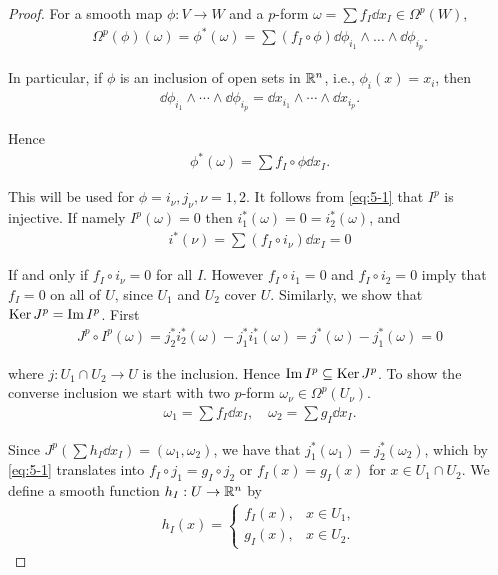 \begin{proof}
  For a smooth map $\phi:V\to W$ and a $p$-form $\omega = \sum f_I\dd x_I\in \Omega^p(W)$,
  \begin{align*}
    \Omega^p(\phi)(\omega)=\phi^*(\omega)=\sum (f_I\circ\phi)\dd\phi_{i_1}\wedge\ldots\wedge\dd\phi_{i_p}.    
  \end{align*}

  In particular, if $\phi$ is an inclusion of open sets in $\mathbb{R}^n$, i.e., $\phi_i(x) = x_i$, then 
  \begin{align*}
    \dd \phi_{i_1}\wedge\cdots\wedge\dd\phi_{i_p} = \dd x_{i_1}\wedge\cdots\wedge\dd x_{i_p}.  
  \end{align*}

  Hence 
  \begin{align}\label{eq:5-1}
    \phi^*(\omega) = \sum f_I\circ\phi\dd x_I.
  \end{align}

  This will be used for $\phi = i_\nu, j_\nu, \nu=1, 2$. It follows from \eqref{eq:5-1} that $I^p$ is injective.
  If namely $I^p(\omega) = 0$ then $i^*_1(\omega) = 0 = i^*_2(\omega)$, and 
  \begin{align*}
    i^*(\nu) = \sum (f_I\circ i_\nu)\dd x_I = 0
  \end{align*}

  If and only if $f_I\circ i_\nu = 0$ for all $I$. However $f_I\circ i_1 = 0$ and $f_I\circ i_2 = 0$ imply that
  $f_I = 0$ on all of $U$, since $U_1$ and $U_2$ cover $U$. Similarly, we show that $\operatorname{Ker} J^p = \operatorname{Im} I^p$. First 
  \begin{align*}
    J^p\circ I^p(\omega) 
    = j^*_2i^*_2(\omega) - j^*_1i^*_1(\omega) 
    = j^*(\omega) - j^*_1(\omega) 
    = 0
  \end{align*}

  where $j:U_1\cap U_2 \to U$ is the inclusion. Hence $\operatorname{Im} I^p \subseteq \operatorname{Ker} J^p$. To show the converse inclusion 
  we start with two $p$-form $\omega_\nu\in \Omega^p(U_\nu)$.
  \begin{align*}
    \omega_1 = \sum f_I\dd x_I, \quad \omega_2 = \sum g_I\dd x_I.
  \end{align*}

  Since $J^p(\sum h_I\dd x_I) = (\omega_1, \omega_2)$, we have that $j_1^*(\omega_1) = j^*_2(\omega_2)$, which by 
  \eqref{eq:5-1} translates into $f_I\circ j_1 = g_I\circ j_2$ or $f_I(x) = g_I(x)$ for $x\in U_1\cap U_2$. We define 
  a smooth function $h_I:U\to \mathbb{R}^n$ by
  \begin{align*}
    h_I(x) = \begin{cases}
      f_I(x), & x\in U_1,\\
      g_I(x), & x\in U_2.
    \end{cases}  
  \end{align*}
  

\end{proof}
